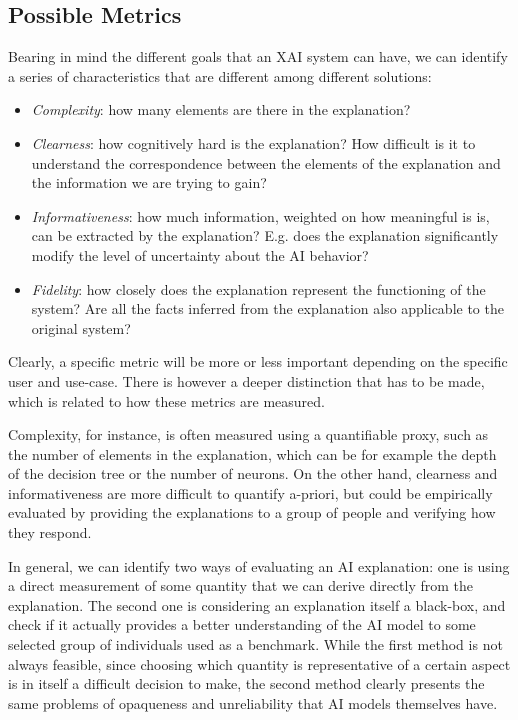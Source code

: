 \documentclass[conference]{IEEEtran}
\begin{document}
\subsection{Possible Metrics}
\label{sec:dimensions}

Bearing in mind the different goals that an XAI system can have, we can identify
a series of characteristics that are different among different solutions:

\begin{itemize}
    \item \textit{Complexity}: how many elements are there in the explanation?
    \item \textit{Clearness}: how cognitively hard is the explanation? How
          difficult is it to understand the correspondence between the elements
          of the explanation and the information we are trying to gain?
    \item \textit{Informativeness}: how much information, weighted on how
          meaningful is is, can be extracted by the explanation? E.g. does the
          explanation significantly modify the level of uncertainty about the AI
          behavior?
    \item \textit{Fidelity}: how closely does the explanation represent the
          functioning of the system? Are all the facts inferred from the
          explanation also applicable to the original system?
\end{itemize}

Clearly, a specific metric will be more or less important depending on the
specific user and use-case. There is however a deeper distinction that has to be
made, which is related to how these metrics are measured.

Complexity, for instance, is often measured using a quantifiable proxy, such as
the number of elements in the explanation, which can be for example the depth of
the decision tree or the number of neurons. On the other hand, clearness and
informativeness are more difficult to quantify a-priori, but could be
empirically evaluated by providing the explanations to a group of people and
verifying how they respond.

In general, we can identify two ways of evaluating an AI explanation: one is
using a direct measurement of some quantity that we can derive directly from the
explanation. The second one is considering an explanation itself a black-box,
and check if it actually provides a better understanding of the AI model to some
selected group of individuals used as a benchmark. While the first method is not
always feasible, since choosing which quantity is representative of a certain
aspect is in itself a difficult decision to make, the second method clearly
presents the same problems of opaqueness and unreliability that AI models
themselves have.
\end{document}
